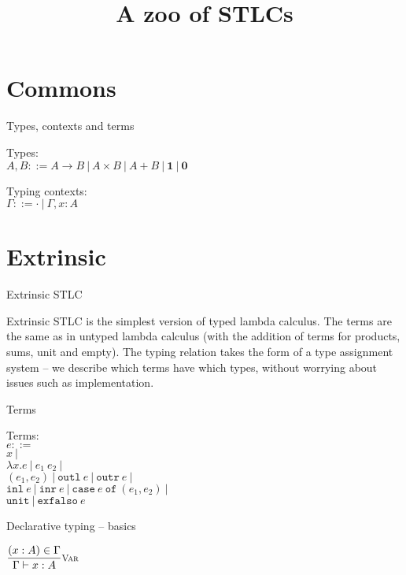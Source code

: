 \documentclass{beamer}
\title{A zoo of STLCs}
\newcommand{\pipe}{\ |\ }
\newcommand{\Fun}[2]{#1 \to #2}
\newcommand{\Prod}[2]{#1 \times #2}
\newcommand{\Sum}[2]{#1 + #2}
\newcommand{\Unit}{\textbf{1}}
\newcommand{\Empty}{\textbf{0}}
\newcommand{\fun}[2]{\lambda #1. #2}
\newcommand{\app}[2]{#1\ #2}
\newcommand{\pair}[2]{(#1, #2)}
\newcommand{\outl}[1]{\texttt{outl}\ #1}
\newcommand{\outr}[1]{\texttt{outr}\ #1}
\newcommand{\inl}[1]{\texttt{inl}\ #1}
\newcommand{\inr}[1]{\texttt{inr}\ #1}
\newcommand{\case}[3]{\texttt{case}\ #1\ \texttt{of}\ (#2, #3)}
\newcommand{\unit}{\texttt{unit}}
\newcommand{\exfalso}[1]{\texttt{exfalso}\ #1}
\newcommand{\fulltyping}[3]{#1 \vdash #2 : #3}
\newcommand{\typing}[2]{\fulltyping{\Gamma}{#1}{#2}}
\newcommand{\rulename}[1]{\textsc{\footnotesize{#1}}}
\newcommand{\infrule}[3][]{\displaystyle \frac{#2}{#3} \rulename{#1}}
\newcommand{\emptytypingctx}{\cdot}
\newcommand{\extend}[3]{#1, #2 : #3}
\newcommand{\sidecond}[1]{#1}
\begin{document}
\frame{\titlepage}

\section{Commons}

\begin{frame}{Types, contexts and terms}

Types: \\
$A, B ::= \Fun{A}{B} \pipe \Prod{A}{B} \pipe \Sum{A}{B} \pipe \Unit \pipe \Empty$

\vspace{2em}

Typing contexts: \\
$\Gamma ::= \emptytypingctx \pipe \extend{\Gamma}{x}{A}$

\end{frame}

\section{Extrinsic}

\begin{frame}{Extrinsic STLC}

Extrinsic STLC is the simplest version of typed lambda calculus. The terms are the same as in untyped lambda calculus (with the addition of terms for products, sums, unit and empty). The typing relation takes the form of a type assignment system -- we describe which terms have which types, without worrying about issues such as implementation.

\end{frame}

\begin{frame}{Terms}

Terms: \\
$e ::=$ \\
\qquad $x \pipe$ \\
\qquad $\fun{x}{e} \pipe \app{e_1}{e_2} \pipe$ \\
\qquad $\pair{e_1}{e_2} \pipe \outl{e} \pipe \outr{e} \pipe$ \\
\qquad $\inl{e} \pipe \inr{e} \pipe \case{e}{e_1}{e_2} \pipe$ \\
\qquad $\unit \pipe \exfalso{e}$

\end{frame}

\begin{frame}{Declarative typing -- basics}

\begin{center}
  $\infrule[Var]{\sidecond{(x : A) \in \Gamma}}{\typing{x}{A}}$
\end{center}

\end{frame}
\end{document}
